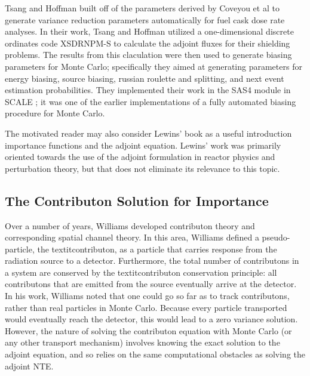 Tsang and Hoffman \cite{tsang_monte_1988} built off of the parameters derived by
Coveyou et al \cite{coveyou_adjoint_1967} to generate variance reduction
parameters automatically for fuel cask dose rate analyses. In their work, Tsang
and Hoffman utilized a one-dimensional discrete ordinates code XSDRNPM-S to
calculate the adjoint fluxes for their shielding problems. The results from this
claculation were then used to generate biasing parameters for Monte Carlo;
specifically they aimed at generating parameters for energy biasing, source
biasing, russian roulette and splitting, and next event estimation
probabilities. They implemented their work in the SAS4 module in SCALE
\cite{SCALE6_1}; it was
one of the earlier implementations of a fully automated biasing procedure for
Monte Carlo.


The motivated reader may also consider Lewins' book
\cite{lewins_importance:_1965} as a
useful introduction importance functions and the adjoint equation. Lewins' work was
primarily oriented towards the use of the adjoint formulation in reactor physics and
perturbation theory, but that does not eliminate its relevance to this topic.


\subsection{The Contributon Solution for Importance}
\label{sec:ContributonImportance}

Over a number of years, Williams
\cite{williams_generalized_1991,williams_contributorn_1992,williams_contributon_study}
developed contributon theory and corresponding spatial channel theory. In this
area, Williams defined a pseudo-particle, the textit{contributon}, as a particle
that carries response from the radiation source to a detector. Furthermore, the
total number of contributons in a system are conserved by the textit{contributon
conservation principle}: all contributons that are emitted from the source
eventually arrive at the detector.  In his work, Williams noted that one could
go so far as to track contributons, rather than real particles in Monte Carlo.
Because every particle transported would eventually reach the detector, this
would lead to a zero variance solution. However, the nature of solving the
contributon equation with Monte Carlo (or any other transport mechanism)
involves knowing the exact solution to the adjoint equation, and so relies on
the same computational obstacles as solving the adjoint NTE.

